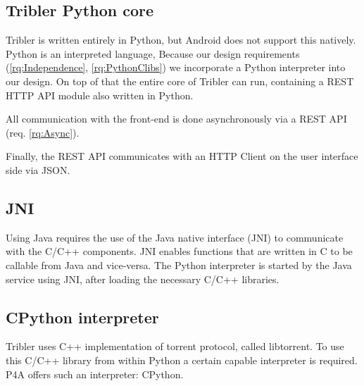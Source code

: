 \subsection{Tribler Python core}
Tribler is written entirely in Python, but Android does not support this natively.
Python is an interpreted language, 
Because our design requirements (\ref{rq:Independence}, \ref{rq:PythonClibs})  we incorporate a Python interpreter into our design.
On top of that the entire core of Tribler can run, containing a REST HTTP API module also written in Python.



All communication with the front-end is done asynchronously via a REST API (req. \ref{rq:Async}).

Finally, the REST API communicates with an HTTP Client on the user interface side via JSON.


\subsection{JNI}
Using Java requires the use of the Java native interface (JNI) to communicate with the C/C++ components.
JNI enables functions that are written in C to be callable from Java and vice-versa.
The Python interpreter is started by the Java service using JNI, after loading the necessary C/C++ libraries.


\subsection{CPython interpreter}
Tribler uses C++ implementation of torrent protocol, called libtorrent.
To use this C/C++ library from within Python a certain capable interpreter is required.
P4A offers such an interpreter: CPython.


